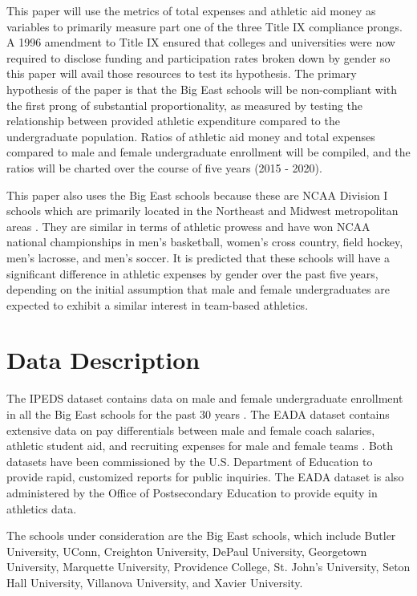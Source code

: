 \documentclass[11pt]{article}
\begin{document}
This paper will use the metrics of total expenses and athletic aid money as variables to primarily measure part one of the three Title IX compliance prongs. A 1996 amendment to Title IX ensured that colleges and universities were now required to disclose funding and participation rates broken down by gender so this paper will avail those resources to test its hypothesis. The primary hypothesis of the paper is that the Big East schools will be non-compliant with the first prong of substantial proportionality, as measured by testing the relationship between provided athletic expenditure compared to the undergraduate population. Ratios of athletic aid money and total expenses compared to male and female undergraduate enrollment will be compiled, and the ratios will be charted over the course of five years (2015 - 2020). 

This paper also uses the Big East schools because these are NCAA Division I schools which are primarily located in the Northeast and Midwest metropolitan areas \cite{Augustyn}. They are similar in terms of athletic prowess and have won NCAA national championships in men's basketball, women's cross country, field hockey, men's lacrosse, and men's soccer. It is predicted that these schools will have a significant difference in athletic expenses by gender over the past five years, depending on the initial assumption that male and female undergraduates are expected to exhibit a similar interest in team-based athletics.

\section{Data Description}

The IPEDS dataset contains data on male and female undergraduate enrollment in all the Big East schools for the past 30 years \citet{keyi}. The EADA dataset contains extensive data on pay differentials between male and female coach salaries, athletic student aid, and recruiting expenses for male and female teams \citet{keye}. Both datasets have been commissioned by the U.S. Department of Education to provide rapid, customized reports for public inquiries. The EADA dataset is also administered by the Office of Postsecondary Education to provide equity in athletics data. 

The schools under consideration are the Big East schools, which include Butler University, UConn, Creighton University, DePaul University, Georgetown University, Marquette University, Providence College, St. John's University, Seton Hall University, Villanova University, and Xavier University. 
\end{document}
